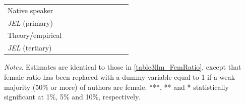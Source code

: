 \begin{table}
\begin{threeparttable}
\begin{tabular}{p{3cm}S@{}S@{}S@{}S@{}S@{}S@{}S@{}S@{}S@{}}
            Native speaker                &               &               &               &               &           {}   &           {}   &           {}   &           {}   &           {}   \\
            \textit{JEL} (primary)        &               &               &               &               &               &               &           {}   &               &               \\
            Theory/empirical              &               &               &               &               &               &               &               &           {}   &               \\
            \textit{JEL} (tertiary)       &               &               &               &               &               &               &               &               &           {}   \\
            \bottomrule
        \end{tabular}
        \begin{tablenotes}
            \tiny
            \item \textit{Notes}. Estimates are identical to those in \autoref{table3llm_FemRatio}, except that female ratio has been replaced with a dummy variable equal to 1 if a weak majority (50\% or more) of authors are female. ***, ** and * statistically significant at 1\%, 5\% and 10\%, respectively.
        \end{tablenotes}
    \end{threeparttable}
\end{table}